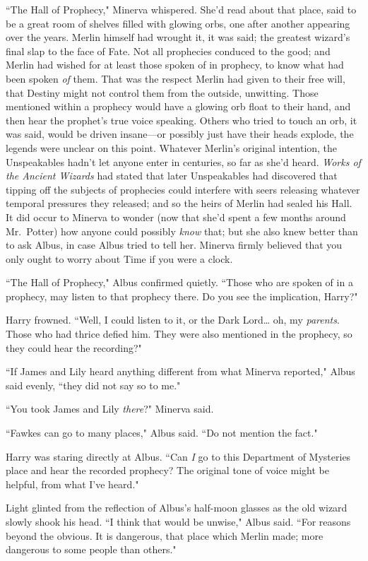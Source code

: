``The Hall of Prophecy," Minerva whispered. She'd read about that place, said to be a great room of shelves filled with glowing orbs, one after another appearing over the years. Merlin himself had wrought it, it was said; the greatest wizard's final slap to the face of Fate. Not all prophecies conduced to the good; and Merlin had wished for at least those spoken of in prophecy, to know what had been spoken \emph{of} them. That was the respect Merlin had given to their free will, that Destiny might not control them from the outside, unwitting. Those mentioned within a prophecy would have a glowing orb float to their hand, and then hear the prophet's true voice speaking. Others who tried to touch an orb, it was said, would be driven insane—or possibly just have their heads explode, the legends were unclear on this point. Whatever Merlin's original intention, the Unspeakables hadn't let anyone enter in centuries, so far as she'd heard. \emph{Works of the Ancient Wizards} had stated that later Unspeakables had discovered that tipping off the subjects of prophecies could interfere with seers releasing whatever temporal pressures they released; and so the heirs of Merlin had sealed his Hall. It did occur to Minerva to wonder (now that she'd spent a few months around Mr.~Potter) how anyone could possibly \emph{know} that; but she also knew better than to ask Albus, in case Albus tried to tell her. Minerva firmly believed that you only ought to worry about Time if you were a clock.

``The Hall of Prophecy," Albus confirmed quietly. ``Those who are spoken of in a prophecy, may listen to that prophecy there. Do you see the implication, Harry?"

Harry frowned. ``Well, I could listen to it, or the Dark Lord{\ldots} oh, my \emph{parents}. Those who had thrice defied him. They were also mentioned in the prophecy, so they could hear the recording?"

``If James and Lily heard anything different from what Minerva reported," Albus said evenly, ``they did not say so to me."

``You took James and Lily \emph{there}?" Minerva said.

``Fawkes can go to many places," Albus said. ``Do not mention the fact."

Harry was staring directly at Albus. ``Can \emph{I} go to this Department of Mysteries place and hear the recorded prophecy? The original tone of voice might be helpful, from what I've heard."

Light glinted from the reflection of Albus's half-moon glasses as the old wizard slowly shook his head. ``I think that would be unwise," Albus said. ``For reasons beyond the obvious. It is dangerous, that place which Merlin made; more dangerous to some people than others."

